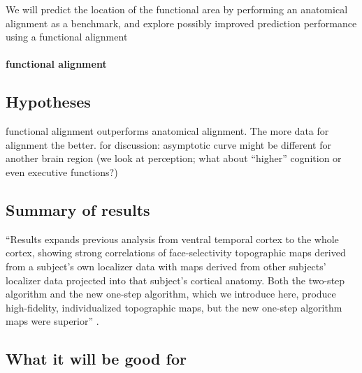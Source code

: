 We will predict the location of the functional area by performing an
anatomical alignment as a benchmark, and explore possibly improved prediction
performance using a functional alignment


\paragraph{functional alignment}



\subsection{Hypotheses}
%
functional alignment outperforms anatomical alignment.
%
The more data for alignment the better.
%
for discussion: asymptotic curve might be different for another brain region
(we look at perception; what about ``higher'' cognition or even executive
functions?)


\subsection{Summary of results}
%
``Results expands previous analysis from ventral temporal cortex to the whole
cortex, showing strong correlations of face-selectivity topographic maps derived
from a subject's own localizer data with maps derived from other subjects'
localizer data projected into that subject's cortical anatomy. Both the two-step
algorithm and the new one-step algorithm, which we introduce here, produce
high-fidelity, individualized topographic maps, but the new one-step algorithm
maps were superior'' \citep{jiahui2020predicting}.


\subsection{What it will be good for}

